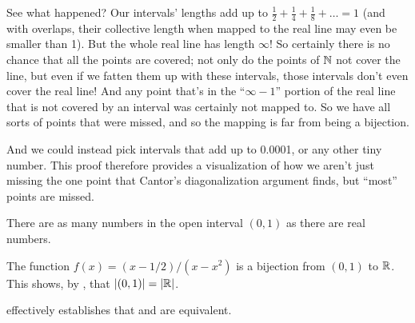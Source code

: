 \documentclass[11pt,twoside=off,numbers=noenddot]{scrbook}
\begin{document}
\begin{proofsketch}
\begin{tightfigure}
  \end{tightfigure}

  See what happened? Our intervals' lengths add up to $\frac{1}{2} +
  \frac{1}{4} + \frac{1}{8} + \dots = 1$ (and with overlaps, their
    collective length when mapped to the real line may even be smaller
  than 1). But the whole real line has length $\infty$! So certainly
  there is no chance that all the points are covered; not only do the
  points of $\mathbb N$ not cover the line, but even if we fatten them up
  with these intervals, those intervals don't even cover the real
  line! And any point that's in the ``$\infty - 1$'' portion of the
  real line that is not covered by an interval was certainly not
  mapped to. So we have all sorts of points that were missed, and so
  the mapping is far from being a bijection.

  And we could instead pick intervals that add up to 0.0001, or any
  other tiny number. This proof therefore provides a visualization of
  how we aren't just missing the one point that Cantor's
  diagonalization argument finds, but ``most'' points are missed.
\end{proofsketch}

\begin{theorem}[$\size{(0, 1)} = \size{\RR}$]
  There are as many numbers in the open interval $(0, 1)$ as there
  are real numbers.
\end{theorem}

\begin{proofidea}
  The function $f(x) = (x-1/2)/(x-x^2)$ is a bijection from $(0, 1)$
  to $\mathbb R$. This shows, by , that
  $\size{(0, 1)} = \size{\RR}$.
\end{proofidea}

\begin{remark}
   effectively establishes that
   and
   are equivalent.
\end{remark}
\end{document}
